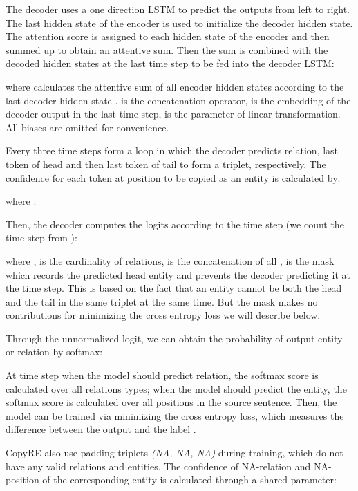 \documentclass[letterpaper]{article} \usepackage{aaai20}  \usepackage{times}  \usepackage{helvet} \usepackage{courier}  \usepackage[hyphens]{url}  \usepackage{graphicx}
\begin{document}
      The decoder uses a one direction LSTM to predict the outputs from left to right. 
      The last hidden state of the encoder is used to initialize the decoder hidden state. 
      The attention score is assigned to each hidden state of the encoder and then summed up to obtain an attentive sum.
Then the sum is combined with the decoded hidden states at the last time step to be fed into the decoder LSTM:
      
      
      
      where  calculates the attentive sum of all encoder hidden states  according to the last decoder hidden state .  is the concatenation operator,  is the embedding of  the decoder output in the last time step,  is the parameter of linear transformation. All biases are omitted for convenience. 
      
      Every three time steps form a loop in which the decoder predicts relation, last token of head and then last token of tail to form a triplet, respectively. The confidence  for each token at position  to be copied as an entity is calculated by:
  
      
      where .
  


      
      Then, the decoder computes the logits according to the time step  (we count the time step from ):

      
      where ,  is the cardinality of relations,  is the concatenation of all ,  is the mask which records the predicted head entity and prevents the decoder predicting it at the  time step. This is based on the fact that an entity cannot be both the head and the tail in the same triplet at the same time. But the mask makes no contributions for minimizing the cross entropy loss we will describe below.


      
      Through the unnormalized logit, we can obtain the probability of output entity or relation by softmax:
      
      
      At time step  when the model should predict relation, the softmax score is calculated over all relations types; when the model should predict the entity, the softmax score is calculated over all positions in the source sentence.
      Then, the model can be trained via minimizing the cross entropy loss, which measures the difference between the output  and the label .
      
      
CopyRE also use padding triplets \textit{(NA, NA, NA)} during training,
      which do not have any valid relations and entities. The confidence  of NA-relation and NA-position of the corresponding entity is calculated through a shared parameter:
      
\end{document}
